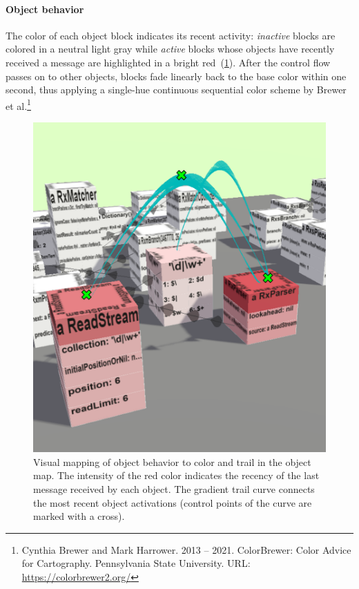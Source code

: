 \paragraph{Object behavior}
\label{sec:visualization_approach/mapping/object_behavior}

The color of each object block indicates its recent activity:
\emph{inactive} blocks are colored in a neutral light gray while \emph{active} blocks whose objects have recently received a message are highlighted in a bright red~(\cref{fig:visualization_approach/mapping/object_behavior}).
After the control flow passes on to other objects, blocks fade linearly back to the base color within one second, thus applying a single-hue continuous sequential color scheme by Brewer et al.\footnote{Cynthia Brewer and Mark Harrower. 2013 -- 2021. ColorBrewer: Color Advice for Cartography. Pennsylvania State University. \textsc{URL}: \url{https://colorbrewer2.org/}}

\begin{figure}
	\includegraphics[width=\linewidth]{sections/03_visualization_approach/mapping/object_behavior}
	\caption{
		Visual mapping of object behavior to color and trail in the object map.
		The intensity of the red color indicates the recency of the last message received by each object.
		The gradient trail curve connects the most recent object activations (control points of the curve are marked with a \protect{} cross).
	}
	\label{fig:visualization_approach/mapping/object_behavior}
\end{figure}


